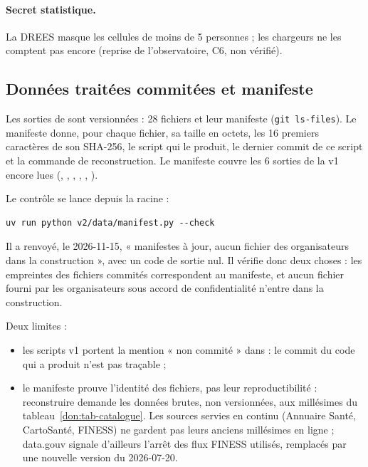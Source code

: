 \paragraph{Secret statistique.} La DREES masque les cellules de moins de 5\mesure{} personnes ; les chargeurs ne
les comptent pas encore (reprise de l'observatoire, C6, non vérifié).

\subsection{Données traitées commitées et manifeste}\label{don:manifeste}

Les sorties de  sont versionnées : 28\mesure{} fichiers et leur manifeste
(\texttt{git ls-files}). Le manifeste  donne, pour chaque fichier, sa
taille en octets, les 16 premiers caractères de son SHA-256, le script qui le produit, le dernier commit de ce
script et la commande de reconstruction. Le manifeste  couvre les
6\mesure{} sorties de la v1 encore lues (, ,
, , ,
).

Le contrôle se lance depuis la racine :
\begin{verbatim}
uv run python v2/data/manifest.py --check
\end{verbatim}
Il a renvoyé, le 2026-11-15, « manifestes à jour, aucun fichier des organisateurs dans la construction », avec
un code de sortie nul\mesure. Il vérifie donc deux choses : les empreintes des fichiers commités correspondent
au manifeste, et aucun fichier fourni par les organisateurs sous accord de confidentialité n'entre dans la
construction.

Deux limites :
\begin{itemize}
  \item les scripts v1 portent la mention « non commité » dans  : le commit
  du code qui a produit  n'est pas traçable ;
  \item le manifeste prouve l'identité des fichiers, pas leur reproductibilité : reconstruire demande les
  données brutes, non versionnées, aux millésimes du tableau~\ref{don:tab-catalogue}. Les sources servies en
  continu (Annuaire Santé, CartoSanté, FINESS) ne gardent pas leurs anciens millésimes en ligne ; data.gouv
  signale d'ailleurs l'arrêt des flux FINESS utilisés, remplacés par une nouvelle version du 2026-07-20.
\end{itemize}
\endgroup
